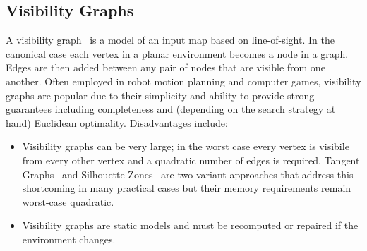 \subsection{Visibility Graphs}
\label{cha::lit::graphs::vis}
A visibility graph~\citep{lozanoperez79} is a model of an input map based on
line-of-sight.  In the canonical case each vertex in a planar environment
becomes a node in a graph. Edges are then added between any pair of nodes that
are visible from one another.  Often employed in robot
motion planning and computer games, visibility graphs are popular due to their 
simplicity and ability to provide strong guarantees including completeness and 
(depending on the search strategy at hand) Euclidean optimality. Disadvantages 
include:
\begin{itemize}
\item Visibility graphs can be very large; in the worst case every
vertex is visibile from every other vertex and a quadratic number
of edges is required. Tangent Graphs~\citep{liu92} and Silhouette Zones~\citep{young01b}
are two variant approaches that address this shortcoming in many practical
cases but their memory requirements remain worst-case quadratic.
\item Visibility graphs are static models and must be recomputed or 
repaired if the environment changes.
\end{itemize}

